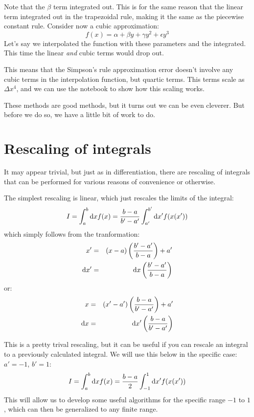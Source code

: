 Note that the $\beta$ term integrated out. This is for the same reason
that the linear term integrated out in the trapezoidal rule, making it
the same as the piecewise constant rule. Consider now a cubic
approximation:
\begin{equation}
  f(x) = \alpha + \beta y + \gamma y^2 + \epsilon y^3
\end{equation}
Let's say we interpolated the function with these parameters and the
integrated. This time the linear {\it and} cubic terms would drop out.

This means that the Simpson's rule approximation error doesn't involve
any cubic terms in the interpolation function, but quartic terms. This
terms scale as $\Delta x^4$, and we can use the notebook to show how
this scaling works.

These methods are good methods, but it turns out we can be even
cleverer. But before we do so, we have a little bit of work to do.

\section{Rescaling of integrals}

It may appear trivial, but just as in differentiation, there are
rescaling of integrals that can be performed for various reasons of
convenience or otherwise. 

The simplest rescaling is linear, which just rescales the limits of
the integral:
\begin{equation}
 I = \int_a^b {\rm d}x f(x) = \frac{b-a}{b'-a'} \int_{a'}^{b'} {\rm d}x' f(x(x'))
\end{equation}
which simply follows from the tranformation:
\begin{eqnarray}
x' &=& (x-a) \left(\frac{b' - a'}{b-a}\right) + a' \cr
{\rm d}x' &=& {\rm d}x \left(\frac{b' - a'}{b-a}\right)
\end{eqnarray}
or:
\begin{eqnarray}
x &=& (x'-a') \left(\frac{b - a}{b'-a'}\right) + a' \cr
{\rm d}x &=& {\rm d}x' \left(\frac{b - a}{b'-a'}\right)
\end{eqnarray}

This is a pretty trival rescaling, but it can be useful if you can
rescale an integral to a previously calculated integral. We will use
this below in the specific case: $a'=-1$, $b'=1$:
\begin{equation}
 I = \int_a^b {\rm d}x f(x) = \frac{b-a}{2} \int_{-1}^{1} {\rm d}x' f(x(x'))
\end{equation}
This will allow us to develop some useful algorithms for the specific
range $-1$ to $1$, which can then be generalized to any finite range.

